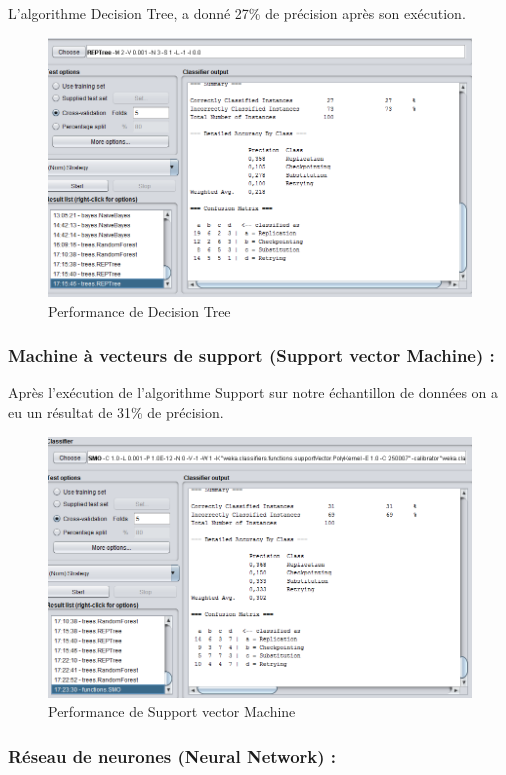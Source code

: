 L'algorithme Decision Tree, a donné 27\% de précision après son exécution.

\begin{figure}[H]
\begin{center}
\includegraphics[width=0.8\linewidth]{images/perfDecTree.PNG}
\end{center}
\caption{Performance de Decision Tree}
\label{fig:27}
\end{figure}


\subsubsection{Machine à vecteurs de support (Support vector Machine) :}

Après l'exécution de l'algorithme Support sur notre échantillon de données on a eu un résultat de 31\% de précision.

\begin{figure}[H]
\begin{center}
\includegraphics[width=0.8\linewidth]{images/perfSMO.PNG}
\end{center}
\caption{Performance de Support vector Machine }
\label{fig:18}
\end{figure}

\subsubsection{Réseau de neurones (Neural Network) :}

